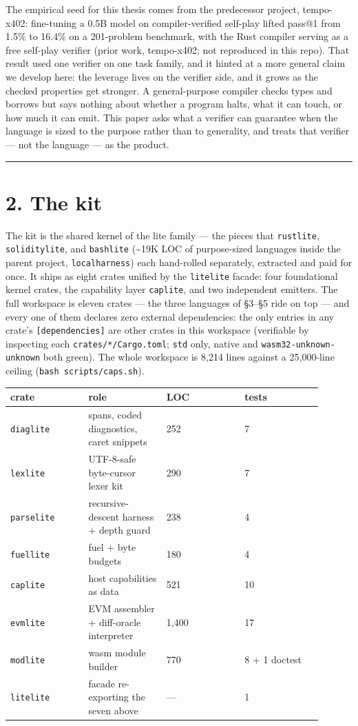 \documentclass[11pt]{article}
\newcommand{\code}[1]{\texttt{#1}}
\begin{document}
The empirical seed for this thesis comes from the predecessor project,
tempo-x402: fine-tuning a 0.5B model on compiler-verified self-play lifted
pass@1 from 1.5\% to 16.4\% on a 201-problem benchmark, with the Rust compiler
serving as a free self-play verifier (prior work, tempo-x402; not reproduced in
this repo). That result used one verifier on one task family, and it hinted at a
more general claim we develop here: the leverage lives on the verifier side, and
it grows as the checked properties get stronger. A general-purpose compiler
checks types and borrows but says nothing about whether a program halts, what it
can touch, or how much it can emit. This paper asks what a verifier can
guarantee when the language is sized to the purpose rather than to generality,
and treats that verifier --- not the language --- as the product.

\bigskip\hrule\bigskip

\section*{2. The kit}

The kit is the shared kernel of the lite family --- the pieces that \code{rustlite},
\code{soliditylite}, and \code{bashlite} (\textasciitilde{}19K LOC of purpose-sized languages inside the
parent project, \code{localharness}) each hand-rolled separately, extracted and paid
for once. It ships as eight crates unified by the \code{litelite} facade: four
foundational kernel crates, the capability layer \code{caplite}, and two independent
emitters. The full workspace is eleven crates --- the three languages of \S{}3--\S{}5
ride on top --- and every one of them declares zero external dependencies: the
only entries in any crate's \code{[dependencies]} are other crates in this
workspace (verifiable by inspecting each \code{crates/*/Cargo.toml}; \code{std} only,
native and \code{wasm32-unknown-unknown} both green). The whole workspace is 8,214
lines against a 25,000-line ceiling (\code{bash scripts/caps.sh}).

\begingroup\small
\begin{longtable}{p{0.225\linewidth} p{0.225\linewidth} p{0.225\linewidth} p{0.225\linewidth}}
\toprule
\textbf{crate} & \textbf{role} & \textbf{LOC} & \textbf{tests} \\
\midrule\endhead
\code{diaglite} & spans, coded diagnostics, caret snippets & 252 & 7 \\
\code{lexlite} & UTF-8-safe byte-cursor lexer kit & 290 & 7 \\
\code{parselite} & recursive-descent harness + depth guard & 238 & 4 \\
\code{fuellite} & fuel + byte budgets & 180 & 4 \\
\code{caplite} & host capabilities as data & 521 & 10 \\
\code{evmlite} & EVM assembler + diff-oracle interpreter & 1,400 & 17 \\
\code{modlite} & wasm module builder & 770 & 8 + 1 doctest \\
\code{litelite} & facade re-exporting the seven above & --- & 1 \\
\bottomrule
\end{longtable}\endgroup
\end{document}

